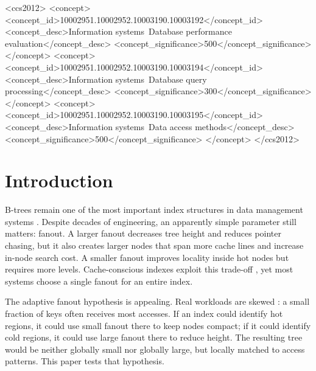 \documentclass[sigconf,review,anonymous]{acmart}
\begin{document}
\begin{CCSXML}
<ccs2012>
 <concept>
  <concept_id>10002951.10002952.10003190.10003192</concept_id>
  <concept_desc>Information systems~Database performance evaluation</concept_desc>
  <concept_significance>500</concept_significance>
 </concept>
 <concept>
  <concept_id>10002951.10002952.10003190.10003194</concept_id>
  <concept_desc>Information systems~Database query processing</concept_desc>
  <concept_significance>300</concept_significance>
 </concept>
 <concept>
  <concept_id>10002951.10002952.10003190.10003195</concept_id>
  <concept_desc>Information systems~Data access methods</concept_desc>
  <concept_significance>500</concept_significance>
 </concept>
</ccs2012>
\end{CCSXML}



\maketitle

\section{Introduction}

B-trees remain one of the most important index structures in data management
systems \cite{bayer1972organization,comer1979ubiquitous,graefe2011modern}.
Despite decades of engineering, an apparently simple parameter still matters:
fanout.  A larger fanout decreases tree height and reduces pointer chasing,
but it also creates larger nodes that span more cache lines and increase
in-node search cost.  A smaller fanout improves locality inside hot nodes but
requires more levels.  Cache-conscious indexes exploit this trade-off
\cite{rao1999cache,rao2000making,chen2001fractal}, yet most systems choose a
single fanout for an entire index.

The adaptive fanout hypothesis is appealing.  Real workloads are skewed
\cite{zipf1949human,cooper2010benchmarking}: a small fraction of keys often
receives most accesses.  If an index could identify hot regions, it could use
small fanout there to keep nodes compact; if it could identify cold regions, it
could use large fanout there to reduce height.  The resulting tree would be
neither globally small nor globally large, but locally matched to access
patterns.  This paper tests that hypothesis.
\end{document}
